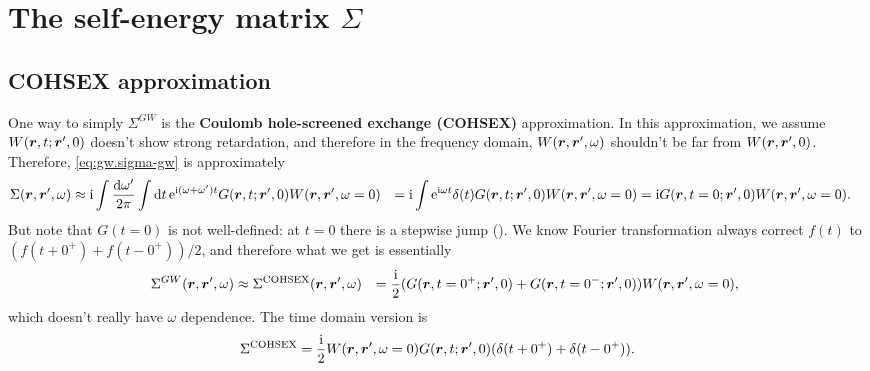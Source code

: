 \documentclass[hyperref, a4paper, 12pt]{report}
\newcommand*{\ii}{\mathrm{i}}
\newcommand*{\ee}{\mathrm{e}}
\newcommand*{\concept}[1]{{\textbf{#1}}}
\def\\{}%
\begin{document}
\section{The self-energy matrix $\Sigma$}

\subsection{COHSEX approximation}\label{sec:cohsex-approx-1}

One way to simply $\Sigma^{GW}$ is the 
\concept{Coulomb hole-screened exchange (COHSEX)} approximation.
In this approximation, 
we assume $W(\vb*{r}, t; \vb*{r}', 0)$ doesn't show strong retardation,
and therefore in the frequency domain, 
$W(\vb*{r}, \vb*{r}', \omega)$ shouldn't be far from $W(\vb*{r}, \vb*{r}', 0)$.
Therefore, \eqref{eq:gw.sigma-gw} is approximately 
\[
    \begin{aligned}
        \Sigma(\vb*{r}, \vb*{r}', \omega) &\approx \ii 
        \int \frac{\dd{\omega'}}{2\pi} \int \dd{t} \ee^{\ii (\omega + \omega') t} 
        G(\vb*{r}, t; \vb*{r}', 0) W(\vb*{r}, \vb*{r}', \omega = 0) \\
        &= \ii \int \ee^{\ii \omega t} \delta(t) G(\vb*{r}, t; \vb*{r}', 0) W(\vb*{r}, \vb*{r}', \omega = 0) \\
        &= \ii G(\vb*{r}, t = 0; \vb*{r}', 0) W(\vb*{r}, \vb*{r}', \omega = 0).
    \end{aligned}
\]
But note that $G(t = 0)$ is not well-defined: 
at $t = 0$ there is a stepwise jump ().
We know Fourier transformation 
always correct $f(t)$ to $(f(t + 0^+) + f(t - 0^+)) / 2$,
and therefore what we get is essentially 
\begin{equation}
    \begin{aligned}
        &\quad \Sigma^{GW}(\vb*{r}, \vb*{r}', \omega) \approx
        \Sigma^{\text{COHSEX}} (\vb*{r}, \vb*{r}', \omega) \\
        &= \frac{\ii}{2} (
            G(\vb*{r}, t = 0^+; \vb*{r}', 0) + 
            G(\vb*{r}, t = 0^-; \vb*{r}', 0)
        ) W(\vb*{r}, \vb*{r}', \omega = 0),
    \end{aligned}
\end{equation}
which doesn't really have $\omega$ dependence.
The time domain version is 
\begin{equation}
    \Sigma^{\text{COHSEX}} = \frac{\ii}{2}
    W(\vb*{r}, \vb*{r}', \omega = 0)
    G(\vb*{r}, t; \vb*{r}', 0)
    (\delta(t + 0^+) + \delta(t - 0^+)).
\end{equation}
\end{document}
